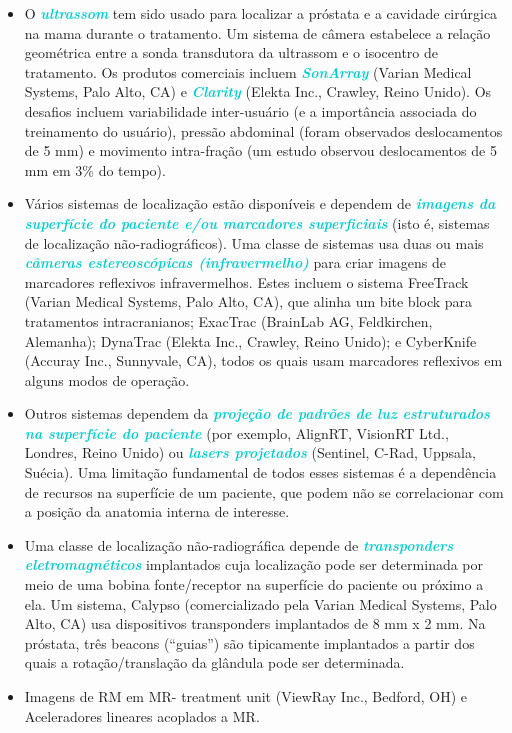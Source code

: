 \documentclass[11pt,a4paper]{article}
\newcounter{exemplo}
\begin{document}
    \begin{itemize}[label=\textcolor{CarnationPink}{$\blacktriangleright$}]
        \item  O \textcolor{DarkTurquoise}{\textbf{\textit{ultrassom}}} tem sido usado para localizar a próstata e a cavidade cirúrgica na mama durante o tratamento. Um sistema de câmera estabelece a relação geométrica entre a sonda transdutora da ultrassom e o isocentro de tratamento. Os produtos comerciais incluem \textcolor{DarkTurquoise}{\textbf{\textit{SonArray}}} (Varian Medical Systems, Palo Alto, CA) e \textcolor{DarkTurquoise}{\textbf{\textit{Clarity}}} (Elekta Inc., Crawley, Reino Unido). Os desafios incluem variabilidade inter-usuário (e a importância associada do treinamento do usuário), pressão abdominal (foram observados deslocamentos de 5 mm) e movimento intra-fração (um estudo observou deslocamentos de 5 mm em 3\% do tempo).

        \item Vários sistemas de localização estão disponíveis e dependem de \textcolor{DarkTurquoise}{\textbf{\textit{imagens da superfície do paciente e/ou marcadores superficiais}}} (isto é, sistemas de localização não-radiográficos). Uma classe de sistemas usa duas ou mais \textcolor{DarkTurquoise}{\textbf{\textit{câmeras estereoscópicas (infravermelho)}}} para criar imagens de marcadores reflexivos infravermelhos. Estes incluem o sistema FreeTrack (Varian Medical Systems, Palo Alto, CA), que alinha um bite block para tratamentos intracranianos; ExacTrac (BrainLab AG, Feldkirchen, Alemanha); DynaTrac (Elekta Inc., Crawley, Reino Unido); e CyberKnife (Accuray Inc., Sunnyvale, CA), todos os quais usam marcadores reflexivos em alguns modos de operação.
        
        \item Outros sistemas dependem da \textcolor{DarkTurquoise}{\textbf{\textit{projeção de padrões de luz estruturados na superfície do paciente}}} (por exemplo, AlignRT, VisionRT Ltd., Londres, Reino Unido) ou \textcolor{DarkTurquoise}{\textbf{\textit{lasers projetados}}} (Sentinel, C-Rad, Uppsala, Suécia). Uma limitação fundamental de todos esses sistemas é a dependência de recursos na superfície de um paciente, que podem não se correlacionar com a posição da anatomia interna de interesse.
        
        \item Uma classe de localização não-radiográfica depende de \textcolor{DarkTurquoise}{\textbf{\textit{transponders eletromagnéticos}}} implantados cuja localização pode ser determinada por meio de uma bobina fonte/receptor na superfície do paciente ou próximo a ela. Um sistema, Calypso (comercializado pela Varian Medical Systems, Palo Alto, CA) usa dispositivos transponders implantados de 8 mm x 2 mm. Na próstata, três beacons (``guias'') são tipicamente implantados a partir dos quais a rotação/translação da glândula pode ser determinada.
        
        \item Imagens de RM em MR- treatment unit (ViewRay Inc., Bedford, OH) e Aceleradores lineares acoplados a MR.
        
    \end{itemize}
\end{document}
